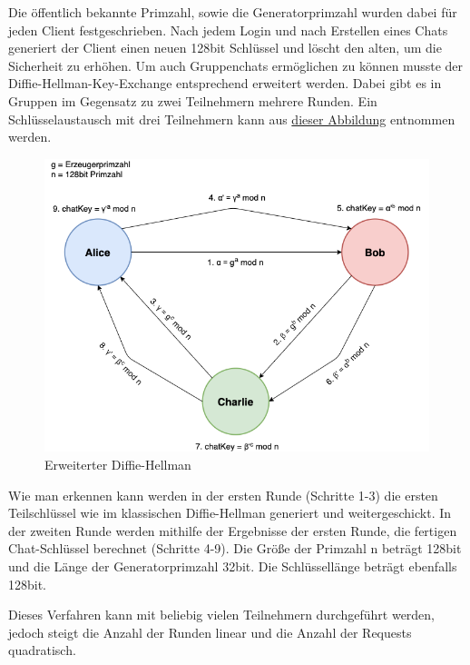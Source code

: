 Die öffentlich bekannte Primzahl, sowie die Generatorprimzahl wurden dabei für jeden Client festgeschrieben.
Nach jedem Login und nach Erstellen eines Chats generiert der Client einen neuen 128bit Schlüssel und löscht den alten, um die Sicherheit zu erhöhen.
Um auch Gruppenchats ermöglichen zu können musste der Diffie-Hellman-Key-Exchange entsprechend erweitert werden.
Dabei gibt es in Gruppen im Gegensatz zu zwei Teilnehmern mehrere Runden.
Ein Schlüsselaustausch mit drei Teilnehmern kann aus \hyperref[DHKE]{dieser Abbildung} entnommen werden.

\begin{figure}[h]
  \centering
  \includegraphics[width=\textwidth]{dh.png}
  
  \caption{Erweiterter Diffie-Hellman}
  \label{DHKE}
\end{figure}

Wie man erkennen kann werden in der ersten Runde (Schritte 1-3) die ersten Teilschlüssel wie im klassischen Diffie-Hellman generiert und weitergeschickt.
In der zweiten Runde werden mithilfe der Ergebnisse der ersten Runde, die fertigen Chat-Schlüssel berechnet (Schritte 4-9).
Die Größe der Primzahl n beträgt 128bit und die Länge der Generatorprimzahl 32bit. Die Schlüssellänge beträgt ebenfalls 128bit.

Dieses Verfahren kann mit beliebig vielen Teilnehmern durchgeführt werden, 
jedoch steigt die Anzahl der Runden linear und die Anzahl der Requests quadratisch.

